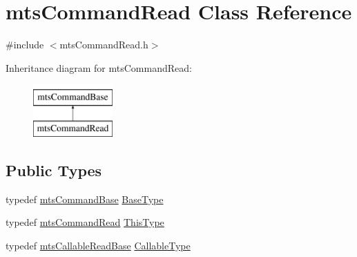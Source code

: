 \hypertarget{classmts_command_read}{\section{mts\-Command\-Read Class Reference}
\label{classmts_command_read}
}


{\ttfamily \#include $<$mts\-Command\-Read.\-h$>$}

Inheritance diagram for mts\-Command\-Read\-:\begin{figure}[H]
\begin{center}
\leavevmode
\includegraphics[height=2.000000cm]{d5/d90/classmts_command_read}
\end{center}
\end{figure}
\subsection*{Public Types}
\begin{DoxyCompactItemize}
\item 
typedef \hyperlink{classmts_command_base}{mts\-Command\-Base} \hyperlink{classmts_command_read_a40bc517108c9ab125caf8477013eda34}{Base\-Type}
\item 
typedef \hyperlink{classmts_command_read}{mts\-Command\-Read} \hyperlink{classmts_command_read_aec958a1f6afb4ec00138f7867a1e25b9}{This\-Type}
\item 
typedef \hyperlink{classmts_callable_read_base}{mts\-Callable\-Read\-Base} \hyperlink{classmts_command_read_a5949311ea142c1c13cb29242c5151da6}{Callable\-Type}
\end{DoxyCompactItemize}

